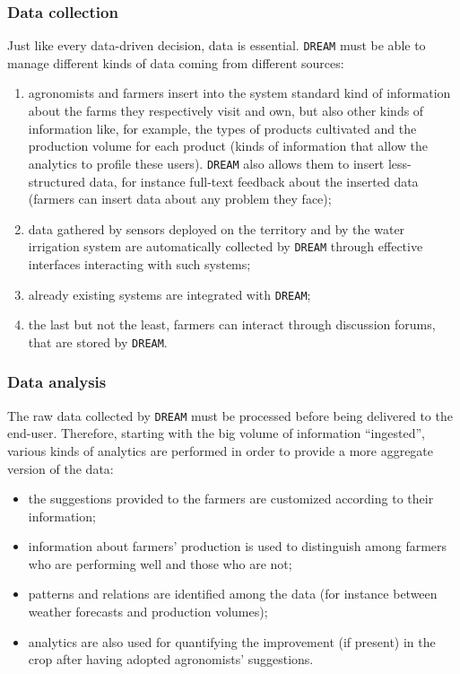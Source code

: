 \documentclass{article}
\begin{document}
\subsubsection{Data collection}
Just like every data-driven decision, data is essential. \verb |DREAM| must be able to manage different kinds of data coming from different sources:
\begin{enumerate}
\item agronomists and farmers insert into the system standard kind of information about the farms they 
respectively visit and own, but also other kinds of information like, for example, the types of products 
cultivated and the production volume for each product (kinds of information that allow the analytics to 
profile these users). \verb |DREAM| also allows them to insert less-structured data, for instance full-text feedback 
about the inserted data (farmers can insert data about any problem they face);
\item data gathered by sensors deployed on the territory and by the water irrigation system are automatically 
collected by \verb|DREAM| through effective interfaces interacting with such systems;
\item already existing systems are integrated with \verb|DREAM|;
\item the last but not the least, farmers can interact through discussion forums, that are stored by \verb|DREAM|.
\end{enumerate}
\subsubsection{Data analysis}
The raw data collected by \verb|DREAM| must be processed before being delivered to the end-user. Therefore, 
starting with the big volume of information “ingested”, various kinds of analytics are performed in order to 
provide a more aggregate version of the data:
\begin{itemize}
\item the suggestions provided to the farmers are customized according to their information;
\item information about farmers’ production is used to distinguish among farmers who are performing well 
and those who are not;%
\item  patterns and relations are identified among the data (for instance between weather 
forecasts and production volumes);
\item analytics are also used for quantifying the improvement (if present) in the crop after having adopted agronomists’ suggestions.
\end{itemize}
\end{document}

